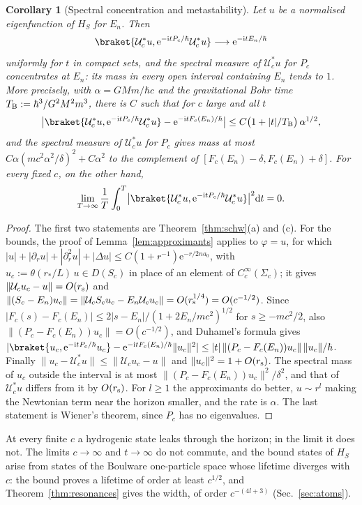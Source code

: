 \documentclass[%
 aip,
 jmp,
 amsmath,amssymb,
 reprint, onecolumn
]{revtex4-1}
\newtheorem{corollary}{Corollary}
\theoremstyle{definition}
\theoremstyle{remark}
\newcommand{\rmd}{\mathrm{d}}
\newcommand{\rmi}{\mathrm{i}}
\newcommand{\rme}{\mathrm{e}}
\begin{document}
\begin{corollary}[Spectral concentration and metastability]
\label{cor:metastability}
Let $u$ be a normalised eigenfunction of $H_S$ for $E_n$. Then
\[
\braket{\mathcal{U}_c^*u,\rme^{-\rmi tP_c/\hbar}\mathcal{U}_c^*u}
\longrightarrow\rme^{-\rmi tE_n/\hbar}
\]
uniformly for $t$ in compact sets, and the spectral measure of $\mathcal{U}_c^*u$ for $P_c$ concentrates at $E_n$:
its mass in every open interval containing $E_n$ tends to $1$. More
precisely, with $\alpha=GMm/\hbar c$ and the gravitational Bohr time
$T_{\rm B}:=\hbar^3/G^2M^2m^3$, there is $C$ such that for $c$ large and
all $t$
\[
\bigl|\braket{\mathcal{U}_c^*u,\rme^{-\rmi tP_c/\hbar}\mathcal{U}_c^*u}
-\rme^{-\rmi tF_c(E_n)/\hbar}\bigr|\leq C\bigl(1+|t|/T_{\rm B}\bigr)\,
\alpha^{1/2},
\]
and the spectral measure of $\mathcal{U}_c^*u$ for $P_c$ gives mass at
most $C\alpha(mc^2\alpha^2/\delta)^2+C\alpha^2$ to the complement of
$[F_c(E_n)-\delta,F_c(E_n)+\delta]$.
For every fixed $c$, on the other hand,
\[
\lim_{T\to\infty}\frac1T\int_0^T\bigl|\braket{\mathcal{U}_c^*u,
\rme^{-\rmi tP_c/\hbar}\mathcal{U}_c^*u}\bigr|^2\rmd t=0 .
\]
\end{corollary}

\begin{proof}
The first two statements are Theorem~\ref{thm:schw}(a) and (c). For the
bounds, the proof of Lemma~\ref{lem:approximants} applies to
$\varphi=u$, for which $|u|+|\partial_ru|+|\partial_r^2u|+|\Delta u|\leq
C(1+r^{-1})\rme^{-r/2na_0}$, with $u_c:=\theta(r_*/L)\,u\in D(S_c)$ in
place of an element of $C_c^\infty(\Sigma_c)$; it gives
$\|\mathcal{U}_cu_c-u\|=O(r_{\rm s})$ and
$\|(S_c-E_n)u_c\|=\|\mathcal{U}_cS_cu_c-E_n\mathcal{U}_cu_c\|=
O(r_{\rm s}^{1/4})=O(c^{-1/2})$. Since
$|F_c(s)-F_c(E_n)|\leq2|s-E_n|/(1+2E_n/mc^2)^{1/2}$ for $s\geq-mc^2/2$,
also $\|(P_c-F_c(E_n))u_c\|=O(c^{-1/2})$, and Duhamel's formula gives
$|\braket{u_c,\rme^{-\rmi tP_c/\hbar}u_c}-\rme^{-\rmi tF_c(E_n)/\hbar}
\|u_c\|^2|\leq|t|\,\|(P_c-F_c(E_n))u_c\|\,\|u_c\|/\hbar$. Finally
$\|u_c-\mathcal{U}_c^*u\|\leq\|\mathcal{U}_cu_c-u\|$ and
$\|u_c\|^2=1+O(r_{\rm s})$. The spectral mass of $u_c$ outside the
interval is at most $\|(P_c-F_c(E_n))u_c\|^2/\delta^2$, and that of
$\mathcal{U}_c^*u$ differs from it by $O(r_{\rm s})$. For $l\geq1$ the
approximants do better, $u\sim r^l$ making the Newtonian term near the
horizon smaller, and the rate is $\alpha$. The last statement is Wiener's
theorem, since $P_c$ has no eigenvalues.
\end{proof}

At every finite $c$ a hydrogenic state leaks through the horizon; in
the limit it does not. The limits $c\to\infty$ and $t\to\infty$ do not
commute, and the bound states of $H_S$ arise from states of the
Boulware one-particle space whose lifetime diverges with $c$: the bound
proves a lifetime of order at least $c^{1/2}$, and
Theorem~\ref{thm:resonances} gives the width, of order $c^{-(4l+3)}$
(Sec.~\ref{sec:atoms}).
\end{document}
